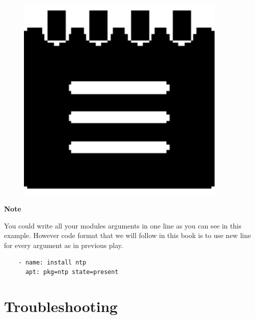 \documentclass[10pt]{book}
\begin{document}
\begin{mdframed}[style=noteStyle]
\begin{minipage}[b]{0.05\textwidth}
\begin{figure}[H]
\includegraphics[width=0.9\textwidth]{figures/notes-icon.eps} 
\end{figure}
\end{minipage}  
\begin{minipage}[b]{0.05\textwidth}
\textbf{Note}
\end{minipage}

You could write all your modules arguments in one line as you can see in this example. 
However code format that we will follow in this book is to use new line for every argument 
as in previous play.

\begin{Verbatim} 
    - name: install ntp
      apt: pkg=ntp state=present
\end{Verbatim}

\end{mdframed}



\section{Troubleshooting}
\end{document}
